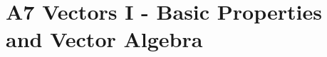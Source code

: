 \chapter{A7 Vectors I - Basic Properties and Vector Algebra}\label{chap:A7}


\clearpage

\clearpage
